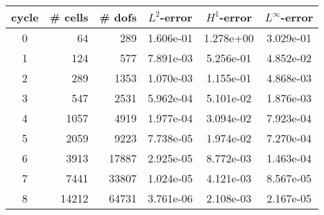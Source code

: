 \documentclass[10pt]{report}
\begin{document}
\begin{table}[H]
\begin{center}
\begin{tabular}{|c|r|r|c|c|c|} \hline
cycle & \# cells & \# dofs & $L^2$-error & $H^1$-error & $L^\infty$-error\\ \hline
0 & 64 & 289 & 1.606e-01 & 1.278e+00 & 3.029e-01\\ \hline
1 & 124 & 577 & 7.891e-03 & 5.256e-01 & 4.852e-02\\ \hline
2 & 289 & 1353 & 1.070e-03 & 1.155e-01 & 4.868e-03\\ \hline
3 & 547 & 2531 & 5.962e-04 & 5.101e-02 & 1.876e-03\\ \hline
4 & 1057 & 4919 & 1.977e-04 & 3.094e-02 & 7.923e-04\\ \hline
5 & 2059 & 9223 & 7.738e-05 & 1.974e-02 & 7.270e-04\\ \hline
6 & 3913 & 17887 & 2.925e-05 & 8.772e-03 & 1.463e-04\\ \hline
7 & 7441 & 33807 & 1.024e-05 & 4.121e-03 & 8.567e-05\\ \hline
8 & 14212 & 64731 & 3.761e-06 & 2.108e-03 & 2.167e-05\\ \hline
\end{tabular}
\end{center}
\end{table}
\end{document}
